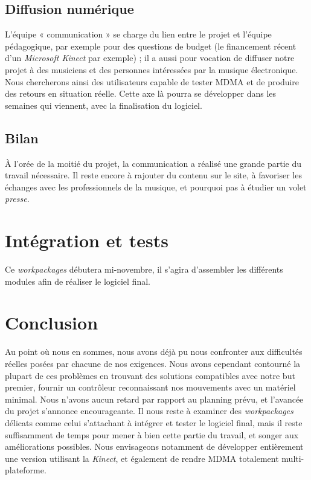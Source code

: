 \subsection{Diffusion numérique}
\par L'équipe « communication » se charge du lien entre le projet et l'équipe pédagogique, par exemple pour des questions de budget (le financement récent d'un \emph{Microsoft Kinect} par exemple) ; il a aussi pour vocation de diffuser notre projet à des musiciens et des personnes intéressées par la musique électronique. Nous chercherons ainsi des utilisateurs capable de tester MDMA et de produire des retours en situation réelle. Cette axe là pourra se développer dans les semaines qui viennent, avec la finalisation du logiciel.
\subsection{Bilan}
\par À l'orée de la moitié du projet, la communication a réalisé une grande partie du travail nécessaire. Il reste encore à rajouter du contenu sur le site, à favoriser les échanges avec les professionnels de la musique, et pourquoi pas à étudier un volet \emph{presse}.



\section{Intégration et tests}
Ce \emph{workpackages} débutera mi-novembre, il s'agira d'assembler les différents modules afin de réaliser le logiciel final.



\section{Conclusion}
Au point où nous en sommes, nous avons déjà pu nous confronter aux difficultés réelles posées par chacune de nos exigences. Nous avons cependant contourné la plupart de ces problèmes en trouvant des solutions compatibles avec notre but premier, fournir un contrôleur reconnaissant nos mouvements avec un matériel minimal. Nous n'avons aucun retard par rapport au planning prévu, et l'avancée du projet s'annonce encourageante. Il nous reste à examiner des \emph{workpackages} délicats comme celui s'attachant à intégrer et tester le logiciel final, mais il reste suffisamment de temps pour mener à bien cette partie du travail, et songer aux améliorations possibles. Nous envisageons notamment de développer entièrement une version utilisant la \emph{Kinect}, et également de rendre MDMA totalement multi-plateforme.



